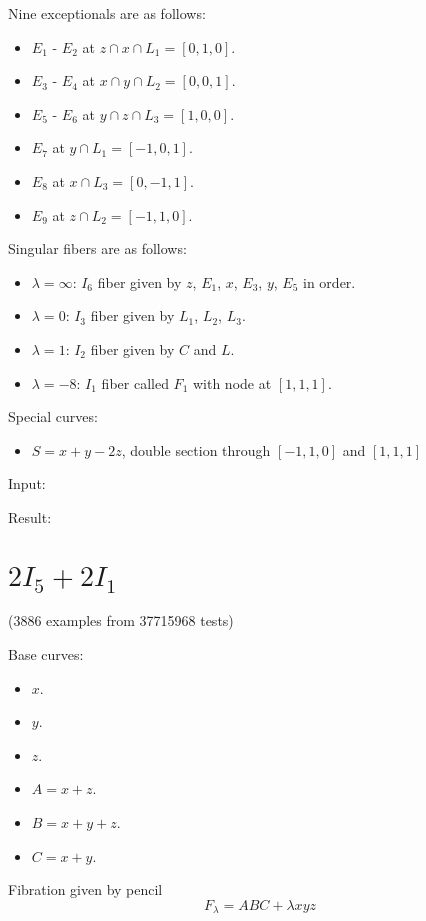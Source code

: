 \documentclass{article}
\begin{document}
Nine exceptionals are as follows:
\begin{itemize}
  \item $E_1$ - $E_2$ at $z \cap x \cap L_1 = [0,1,0]$.
  \item $E_3$ - $E_4$ at $x \cap y \cap L_2 = [0,0,1]$.
  \item $E_5$ - $E_6$ at $y \cap z \cap L_3 = [1,0,0]$.
  \item $E_7$ at $y \cap L_1 = [-1,0,1]$.
  \item $E_8$ at $x \cap L_3 = [0,-1,1]$.
  \item $E_9$ at $z \cap L_2 = [-1,1,0]$.
\end{itemize}
Singular fibers are as follows:
\begin{itemize}
  \item $\lambda = \infty$: $I_6$ fiber given by $z$, $E_1$, $x$, $E_3$, $y$, $E_5$ in order.
  \item $\lambda = 0$: $I_3$ fiber given by $L_1$, $L_2$, $L_3$.
  \item $\lambda = 1$: $I_2$ fiber given by $C$ and $L$.
  \item $\lambda = -8$: $I_1$ fiber called $F_1$ with node at $[1,1,1]$.
\end{itemize}
Special curves:
\begin{itemize}
  \item $S = x + y - 2z$, double section through $[-1,1,0]$ and $[1,1,1]$
\end{itemize}
Input:

Result:




\section{$2I_5 + 2I_1$}

(3886 examples from 37715968 tests)

Base curves:
\begin{itemize}
  \item $x$.
  \item $y$.
  \item $z$.
  \item $A = x + z$.
  \item $B = x + y + z$.
  \item $C = x+y$.
\end{itemize}
Fibration given by pencil
\[F_\lambda = ABC + \lambda xyz\]
\end{document}
